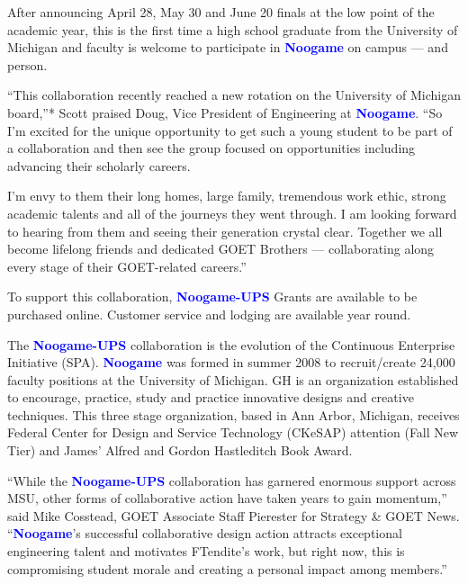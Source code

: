 \documentclass{article}
\begin{document}
\begin{samplebox}[title={\textsc{RePlaid} (s.c.), ancestral sampler, steps $T = 64$ (GenPPL: $48.5$, Entropy: $5.50$, MAUVE: $0.88$)}]
\vspace{1em}
After announcing April 28, May 30 and June 20 finals at the low point of the academic year, this is the first time a high school graduate from the University of Michigan and faculty is welcome to participate in \textcolor{blue}{\textbf{Noogame}} on campus --- and person.

\vspace{1em}
``This collaboration recently reached a new rotation on the University of Michigan board,''* Scott praised Doug, Vice President of Engineering at \textcolor{blue}{\textbf{Noogame}}. ``So I'm excited for the unique opportunity to get such a young student to be part of a collaboration and then see the group focused on opportunities including advancing their scholarly careers.

\vspace{1em}
I'm envy to them their long homes, large family, tremendous work ethic, strong academic talents and all of the journeys they went through. I am looking forward to hearing from them and seeing their generation crystal clear. Together we all become lifelong friends and dedicated GOET Brothers --- collaborating along every stage of their GOET-related careers.''

\vspace{1em}
To support this collaboration, \textcolor{blue}{\textbf{Noogame-UPS}} Grants are available to be purchased online. Customer service and lodging are available year round.

\vspace{1em}
The \textcolor{blue}{\textbf{Noogame-UPS}} collaboration is the evolution of the Continuous Enterprise Initiative (SPA). \textcolor{blue}{\textbf{Noogame}} was formed in summer 2008 to recruit/create 24,000 faculty positions at the University of Michigan. GH is an organization established to encourage, practice, study and practice innovative designs and creative techniques. This three stage organization, based in Ann Arbor, Michigan, receives Federal Center for Design and Service Technology (CKeSAP) attention (Fall New Tier) and James' Alfred and Gordon Hastleditch Book Award.

\vspace{1em}
``While the \textcolor{blue}{\textbf{Noogame-UPS}} collaboration has garnered enormous support across MSU, other forms of collaborative action have taken years to gain momentum,'' said Mike Cosstead, GOET Associate Staff Pierester for Strategy \& GOET News. ``\textcolor{blue}{\textbf{Noogame}}'s successful collaborative design action attracts exceptional engineering talent and motivates FTendite's work, but right now, this is compromising student morale and creating a personal impact among members.''


\end{samplebox}
\end{document}
